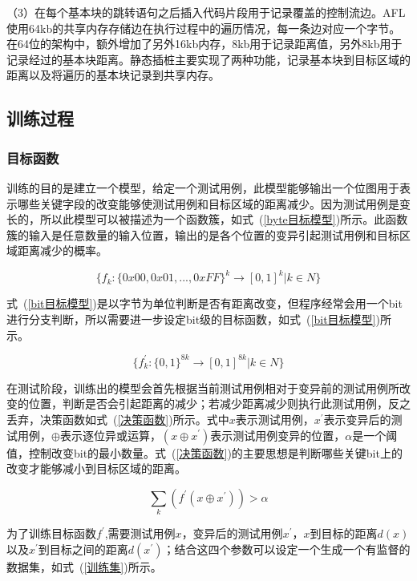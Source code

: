 （3）在每个基本块的跳转语句之后插入代码片段用于记录覆盖的控制流边。AFL使用64kb的共享内存存储边在执行过程中的遍历情况，每一条边对应一个字节。在64位的架构中，额外增加了另外16kb内存，8kb用于记录距离值，另外8kb用于记录经过的基本块距离。静态插桩主要实现了两种功能，记录基本块到目标区域的距离以及将遍历的基本块记录到共享内存。

\subsection{训练过程}

\subsubsection{目标函数}

训练的目的是建立一个模型，给定一个测试用例，此模型能够输出一个位图用于表示哪些关键字段的改变能够使测试用例和目标区域的距离减少。因为测试用例是变长的，所以此模型可以被描述为一个函数簇，如式~(\ref{byte目标模型})所示。此函数簇的输入是任意数量的输入位置，输出的是各个位置的变异引起测试用例和目标区域距离减少的概率。

\begin{equation}\label{byte目标模型}
\{f_{k}: \{0x00, 0x01, ...,0xFF \}^{k} \rightarrow [0,1]^{k} | k \in N \}
\end{equation}

式~(\ref{bit目标模型})是以字节为单位判断是否有距离改变，但程序经常会用一个bit进行分支判断，所以需要进一步设定bit级的目标函数，如式~(\ref{bit目标模型})所示。

\begin{equation}\label{bit目标模型}
\{f^{'}_{k}: \{0,1 \}^{8k} \rightarrow [0,1]^{8k} | k \in N \}
\end{equation}

在测试阶段，训练出的模型会首先根据当前测试用例相对于变异前的测试用例所改变的位置，判断是否会引起距离的减少；若减少距离减少则执行此测试用例，反之丢弃，决策函数如式~(\ref{决策函数})所示。式中$x$表示测试用例，$x^{'}$表示变异后的测试用例，$\oplus$表示逐位异或运算，$(x \oplus x^{'})$表示测试用例变异的位置，$\alpha$是一个阈值，控制改变bit的最小数量。式~(\ref{决策函数})的主要思想是判断哪些关键bit上的改变才能够减小到目标区域的距离。

\begin{equation}\label{决策函数}
\sum_{k}(f^{'}(x \oplus x^{'})) > \alpha
\end{equation}

为了训练目标函数$f^{'}$,需要测试用例$x$，变异后的测试用例$x^{'}$，$x$到目标的距离$d(x)$以及$x^{'}$到目标之间的距离$d(x^{'})$；结合这四个参数可以设定一个生成一个有监督的数据集，如式~(\ref{训练集})所示。

